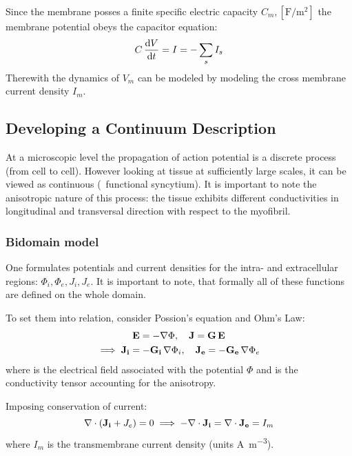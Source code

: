 Since the membrane posses a finite specific electric capacity $C_m,
[\si{\farad\per\metre\squared}]$
the membrane potential obeys the capacitor equation:
\begin{equation}
    C\,\dv{V}{t}=I=-\sum_{s}I_{s}
    \label{eq:cap}
\end{equation}
Therewith the dynamics of $V_m$ can be modeled by modeling the cross
membrane current density $I_m$.


\subsection{Developing a Continuum Description}
At a microscopic level the propagation of action potential is a discrete
process (from cell to cell). However looking at tissue at sufficiently
large scales, it can be viewed as continuous (\textrightarrow~functional
syncytium). It is important to note the anisotropic nature of this process:
the tissue exhibits different conductivities in longitudinal and transversal
direction with respect to the myofibril.

\subsubsection{Bidomain model}
One formulates potentials and current densities for the intra- and
extracellular regions: $\Phi_i, \Phi_e, J_i, J_e$.
It is important to note, that formally all of these functions are defined
on the whole domain.

To set them into relation, consider Possion's equation and Ohm's Law:
\begin{gather}
    \mathbf{E}=-\nabla\Phi,\quad \mathbf{J}=\mathbf{G}\,\mathbf{E} \nonumber \\
    \implies \mathbf{J_i}=-\mathbf{G_i}\,\nabla\Phi_i,\quad
    \mathbf{J_e}=-\mathbf{G_e}\,\nabla\Phi_e
\end{gather}
where  is the electrical field associated with the potential $\Phi$
and  is the conductivity tensor accounting for the anisotropy.

Imposing conservation of current:
\begin{equation}
    \nabla\cdot(\mathbf{J_i}+{J_e})=0 \implies
    -\nabla\cdot\mathbf{J_i}=\nabla\cdot\mathbf{J_e}=I_m
\end{equation}
where $I_m$ is the transmembrane current density (units
\si{\ampere\per\metre\cubed}).

